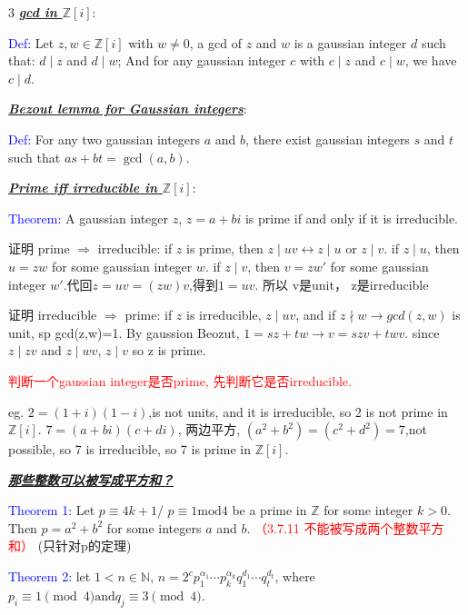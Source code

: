 \documentclass[12pt]{article}
\newcommand{\bulletPoint}[1]{\underline{\textit{\textbf{#1}}}}
\begin{document}
\begin{multicols*}{3}
\bulletPoint{gcd in $\mathbb{Z}[i]$}:

\textcolor{blue}{Def:} Let $z,w\in \mathbb{Z}[i]$ with $w\neq 0$, a gcd of $z$ and $w$ is a gaussian integer $d$ such that:
$d\mid z$ and $d\mid w$;
And for any gaussian integer $c$ with $c\mid z$ and $c\mid w$, we have $c\mid d$.



\bulletPoint{Bezout lemma for Gaussian integers}:

\textcolor{blue}{Def:} For any two gaussian integers $a$ and $b$, there exist gaussian integers $s$ and $t$ such that $as + bt = \gcd(a, b)$.



\bulletPoint{Prime iff irreducible in $\mathbb{Z}[i]$}:

\textcolor{blue}{Theorem:} A gaussian integer $z$, $z=a+bi$ is prime if and only if it is irreducible.

\textcolor{magenta!90!black}{证明 prime $\Longrightarrow$ irreducible:} 
if $z$ is prime, then $z\mid uv \longleftrightarrow z\mid u$ or $z\mid v$. if $z\mid u$, then $u=zw$ for some gaussian integer $w$. 
if $z\mid v$, then $v=zw'$ for some gaussian integer $w'$.代回$z=uv=(zw)v$,得到$1=uv$. 所以 v是unit， z是irreducible

\textcolor{magenta!90!black}{证明 irreducible $\Longrightarrow$ prime:}
if $z$ is irreducible, $z\mid uv$, and if $z\nmid w \longrightarrow gcd(z,w)$ is unit, sp gcd(z,w)=1.
By gaussion Beozut, $1=sz+tw \longrightarrow v=szv+twv$. since $z\mid zv$ and $z\mid wv$, $z\mid v$ so z is prime. 

\textcolor{red}{判断一个gaussian integer是否prime, 先判断它是否irreducible.} 

eg. $2=(1+i)(1-i)$,is not units, and it is irreducible, 
so 2 is not prime in $\mathbb{Z}[i]$. $7=(a+bi)(c+di)$, 两边平方, $(a^2+b^2)=(c^2+d^2)=7$,not possible, so 7 is irreducible,
 so 7 is prime in $\mathbb{Z}[i]$.


\bulletPoint{那些整数可以被写成平方和？}

\textcolor{blue}{Theorem 1:} Let \textcolor{magenta!90!black}{$p\equiv 4k+1$/ $p\equiv 1 \text{mod} 4$} be a prime in $\mathbb{Z}$ 
for some integer $k>0$. Then \textcolor{magenta!90!black}{$p=a^2+b^2$} for some integers $a$ and $b$. \textcolor{red}{（3.7.11 不能被写成两个整数平方和）}
\textcolor{green!60!black}{(只针对p的定理)}

\textcolor{blue}{Theorem 2:} let $1<n\in \mathbb{N}$,  $n=2^c p_1^{\alpha_1}\cdots p_k^{\alpha_k}
q_1^{d_1}\cdots q_t^{d_t}$, where $p_i \equiv 1 \pmod{4} \text{and} 
q_j \equiv 3 \pmod{4}.$



\end{multicols*}
\end{document}
